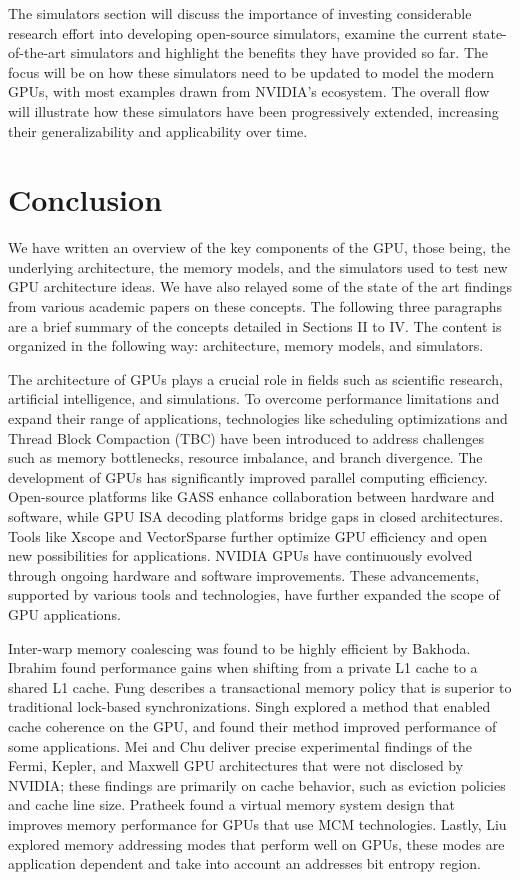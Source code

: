 \documentclass[conference]{IEEEtran}
\begin{document}
The simulators section will discuss the importance of investing considerable research effort into developing open-source simulators, examine the current state-of-the-art simulators and highlight the benefits they have provided so far.
The focus will be on how these simulators need to be updated to model the modern GPUs, with most examples drawn from NVIDIA's ecosystem.
The overall flow will illustrate how these simulators have been progressively extended, increasing their generalizability and applicability over time.




\section{Conclusion}
We have written an overview of the key components of the GPU, those being, the underlying architecture, the memory models, and the simulators used to test new GPU architecture ideas.
We have also relayed some of the state of the art findings from various academic papers on these concepts.
The following three paragraphs are a brief summary of the concepts detailed in Sections II to IV. The content is organized in the following way: architecture, memory models, and simulators.

The architecture of GPUs plays a crucial role in fields such as scientific research, artificial intelligence, and simulations. 
To overcome performance limitations and expand their range of applications, technologies like scheduling optimizations and Thread Block Compaction (TBC) have been introduced to address challenges such as memory bottlenecks, resource imbalance, and branch divergence.
The development of GPUs has significantly improved parallel computing efficiency. 
Open-source platforms like GASS enhance collaboration between hardware and software, while GPU ISA decoding platforms bridge gaps in closed architectures. 
Tools like Xscope and VectorSparse further optimize GPU efficiency and open new possibilities for applications.
NVIDIA GPUs have continuously evolved through ongoing hardware and software improvements. 
These advancements, supported by various tools and technologies, have further expanded the scope of GPU applications.

Inter-warp memory coalescing was found to be highly efficient by Bakhoda.
Ibrahim found performance gains when shifting from a private L1 cache to a shared L1 cache.
Fung describes a transactional memory policy that is superior to traditional lock-based synchronizations.
Singh explored a method that enabled cache coherence on the GPU, and found their method improved performance of some applications.
Mei and Chu deliver precise experimental findings of the Fermi, Kepler, and Maxwell GPU architectures that were not disclosed by NVIDIA; these findings are primarily on cache behavior, such as eviction policies and cache line size.
Pratheek found a virtual memory system design that improves memory performance for GPUs that use MCM technologies.
Lastly, Liu explored memory addressing modes that perform well on GPUs, these modes are application dependent and take into account an addresses bit entropy region.
\end{document}
